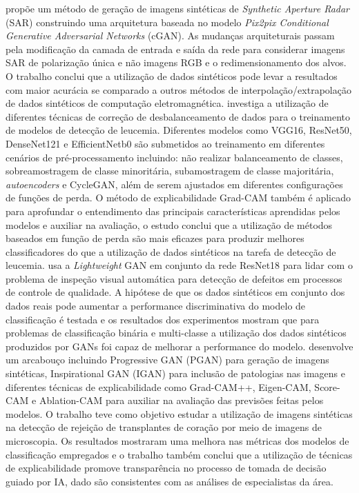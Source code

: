  propõe um método de geração de imagens sintéticas de \textit{Synthetic Aperture Radar} (SAR)  construindo uma arquitetura baseada no modelo \textit{Pix2pix Conditional Generative Adversarial Networks} (cGAN). As mudanças arquiteturais passam pela modificação da camada de entrada e saída da rede para considerar imagens SAR de polarização única e não imagens RGB e o redimensionamento dos alvos. O trabalho conclui que  a utilização de dados sintéticos pode levar a resultados com maior acurácia se comparado a outros métodos de interpolação/extrapolação de dados sintéticos de computação eletromagnética.
 investiga a utilização de diferentes técnicas de correção de desbalanceamento de dados para o treinamento de modelos de detecção de leucemia. Diferentes modelos como VGG16, ResNet50, DenseNet121 e EfficientNetb0 são submetidos ao treinamento em diferentes cenários de pré-processamento incluindo: não realizar balanceamento de classes, sobreamostragem de classe minoritária, subamostragem de classe majoritária, \textit{autoencoders} e CycleGAN, além de serem ajustados em diferentes configurações de funções de perda. O método de explicabilidade Grad-CAM também é aplicado para aprofundar o entendimento das principais características aprendidas pelos modelos e auxiliar na avaliação, o estudo conclui que a utilização de métodos baseados em função de perda são mais eficazes para produzir melhores classificadores do que a utilização de dados sintéticos na tarefa de detecção de leucemia.
 usa a \textit{Lightweight} GAN em conjunto da rede ResNet18 para lidar com o problema de inspeção visual automática para detecção de defeitos em processos de controle de qualidade. A hipótese de que os dados sintéticos em conjunto dos dados reais pode aumentar a performance discriminativa do modelo de classificação é testada e os resultados dos experimentos mostram que para problemas de classificação binária e multi-classe a utilização dos dados sintéticos produzidos por GANs foi capaz de melhorar a performance do modelo.
 desenvolve um arcabouço incluindo Progressive GAN (PGAN) para geração de imagens sintéticas, Inspirational GAN (IGAN) para inclusão de patologias nas imagens e diferentes técnicas de explicabilidade como Grad-CAM++, Eigen-CAM, Score-CAM e Ablation-CAM para auxiliar na avaliação das previsões feitas pelos modelos. O trabalho teve como objetivo estudar a utilização de imagens sintéticas na detecção de rejeição de transplantes de coração por meio de imagens de microscopia. Os resultados mostraram uma melhora nas métricas dos modelos de classificação empregados e o trabalho também conclui que a utilização de técnicas de explicabilidade promove transparência no processo de tomada de decisão guiado por IA, dado são consistentes com as análises de especialistas da área.
